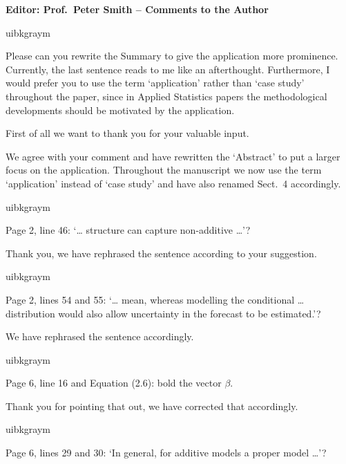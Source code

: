 \documentclass[english, noconfig]{uibklttr}
\newcommand{\section}[1]{{\Large{\textbf{#1}}}}
\newenvironment{re}{
    \begin{color}{uibkgraym}
        \itshape
}{
    \end{color}
}
\begin{document}
\newpage

\section{Editor: Prof.\ Peter Smith -- Comments to the Author}

\begin{re}
Please can you rewrite the Summary to give the application more prominence.
Currently, the last sentence reads to me like an afterthought. Furthermore, I
would prefer you to use the term `application' rather than `case study'
throughout the paper, since in Applied Statistics papers the methodological
developments should be motivated by the application.
\end{re}

\vspace{-1em}
First of all we want to thank you for your valuable input. 

We agree with your comment and have rewritten the `Abstract' to put a larger
focus on the application. Throughout the manuscript we now use the term
`application' instead of `case study' and have also renamed Sect.~4
accordingly.

\vspace{0.5em}
\begin{re}
Page 2, line 46: `… structure can capture non-additive …'?
\end{re}

Thank you, we have rephrased the sentence according to your suggestion.

\vspace{0.5em}
\begin{re}
Page 2, lines 54 and 55: `… mean, whereas modelling the conditional …
distribution would also allow uncertainty in the forecast to be estimated.'?
\end{re}

We have rephrased the sentence accordingly.

\vspace{0.5em}
\begin{re}
Page 6, line 16 and Equation (2.6): bold the vector $\beta$.
\end{re}

Thank you for pointing that out, we have corrected that accordingly.

\vspace{0.5em}
\begin{re}
Page 6, lines 29 and 30: `In general, for additive models a proper model …'?
\end{re}
\end{document}
